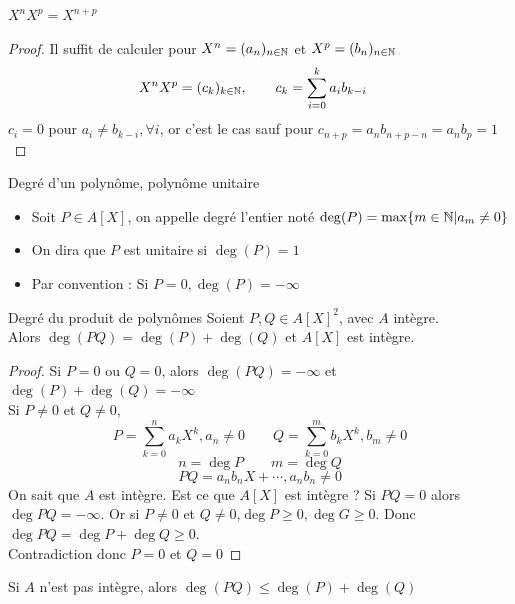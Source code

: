 \documentclass[]{report}
\begin{document}
    \begin{prop}{}{}
        $X^nX^p=X^{n+p}$
    \end{prop}

    \begin{proof}
        Il suffit de calculer pour $X^n=(a_n)_{n\in\mathbb{N}}$ et $X^p=(b_n)_{n\in \mathbb{N}}$
        \begin{align*}
            X^n X^p&= (c_k)_{k\in \mathbb{N}},\qquad c_k=\sum_{i=0}^{k}a_i b_{k-i}
        \end{align*}
        $c_i=0$ pour $a_i\neq b_{k-i},\forall i$, or c'est le cas sauf pour $c_{n+p}=a_{n}b_{n+p-n}= a_n b_p=1$ 
    \end{proof}

    \begin{df}{Degré d'un polynôme, polynôme unitaire}{}
        \begin{itemize}
            \item Soit $P\in A[X]$, on appelle degré l'entier noté $\deg(P)=\max\{ m\in\mathbb{N}|a_m\neq0\}$
            \item On dira que $P$ est unitaire si $\deg(P)=1$
            \item Par convention : Si $P=0, \deg(P)=-\infty$
        \end{itemize}
    \end{df}

    \begin{prop}{Degré du produit de polynômes}{}
        Soient $P,Q\in A[X]^2$, avec $A$ intègre.\\
        Alors $\deg(PQ)=\deg(P)+\deg(Q)$ et $A[X]$ est intègre.
    \end{prop}

    \begin{proof}
        Si $P=0$ ou $Q=0$, alors $\deg (PQ)=-\infty$ et $\deg(P)+\deg (Q)=-\infty$\\
        Si $P\neq 0$ et $Q\neq 0$,
        \[P=\sum_{k=0}^n a_k X^k,a_n\neq 0\qquad Q=\sum_{k=0}^m b_k X^k,b_m\neq 0\]
        \[n=\deg P\qquad m=\deg Q\]
        \[PQ=a_n b_n X+\cdots, a_n b_n\neq 0\]
        On sait que $A$ est intègre. Est ce que $A[X]$ est intègre ? Si $PQ=0$ alors $\deg PQ=-\infty$. Or si $P\neq 0$ et $Q\neq 0$,$\deg P\ge 0,\deg G\ge 0$. Donc $\deg PQ=\deg P +\deg Q \ge 0 $.\\
        Contradiction donc $P=0$ et $Q=0$
    \end{proof}

    \begin{re}{}{}
        Si $A$ n'est pas intègre, alors $\deg(PQ)\le\deg(P)+\deg(Q)$
    \end{re}
\end{document}
